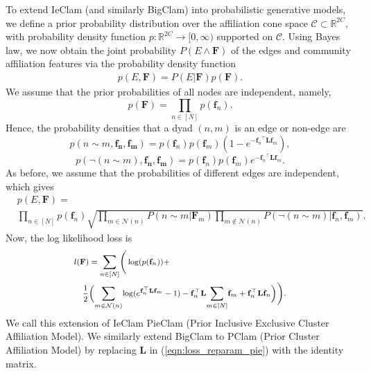 \documentclass{article}
\theoremstyle{plain}
\theoremstyle{definition}
\theoremstyle{remark}
\newcommand{\sumgraphm}{\underset{m \in [N]}{\sum}}
\def \sumgraphu {\underset{n\in [N]}{ \sum}}
\def \sumneighbors {\underset {m\in{\mathcal{N}(n)}}{\sum}}
\newcommand{\flf}{\mathbf{f}_n^\top   \mathbf{L} \mathbf{f}_m}
\begin{document}
To extend IeClam (and similarly BigClam) into probabilistic generative models, we define a prior probability distribution over the affiliation cone space $\mathcal{C}\subset \mathbb{R}^{2C}$, with probability density function $p:\mathbb{R}^{2C}\rightarrow [0,\infty)$ supported on $\mathcal{C}$. Using Bayes law, we now obtain the joint probability $P(E \wedge \mathbf{F})$ of the edges and community affiliation features  via the probability density function
\begin{align*}
    p(E ,\mathbf{F}) = P(E|\mathbf{F}) p(\mathbf{F}).
\end{align*}
We assume that the prior probabilities of all nodes are independent, namely,  
\[p(\mathbf{F}) = \underset{n\in [N]}{\prod} p(\mathbf{f}_n).\]
 Hence, the probability densities that a dyad $(n,m)$ is an edge or non-edge are
\[p(n\sim m, \mathbf{f_n}, \mathbf{f_m}) = p(\mathbf{f}_n)p(\mathbf{f}_m)(1 - e^{-{\mathbf{f}_n}^\top  \mathbf{L} {\mathbf{f}_m}}),\]
\[p(\neg(n\sim m), \mathbf{f_n}, \mathbf{f_m}) = p(\mathbf{f}_n)p(\mathbf{f}_m)e^{-{\mathbf{f}_n}^\top  \mathbf{L} {\mathbf{f}_m}}.\]
As before, we assume that the probabilities of different edges are independent, which gives
\begingroup
\scriptsize
\begin{equation}
\label{eqn:likelihood_prior}
\begin{aligned}
    &p(E, \mathbf{F}) =  \\ &\prod_{n \in [N]} p(\mathbf{f}_n)
        \sqrt{\prod_{m \in \mathcal{N}(n)}P(n\sim m|\mathbf{F}_m)\prod_{m \notin \mathcal{N}(n)}{P(\neg(n\sim m)|\mathbf{f}_n, \mathbf{f}_m)}
        }. 
 \end{aligned}
 \end{equation}
 \endgroup
Now, the log likelihood loss is
\begingroup
\begin{equation}
\footnotesize
\begin{aligned}
\label{eqn:loss_reparam_pie}
   &  l(\mathbf{F})= \sumgraphu \Bigg(\log(p(\mathbf{f}_n)) + \\
   & \quad  \frac{1}{2} \Big(\sumneighbors{\log(e^{\flf} - 1)}  -  \mathbf{f}_n^\top  \mathbf{L}{\sumgraphm{\mathbf{f}_m}} + \mathbf{f}_n^\top  \mathbf{L}\mathbf{f}_n \Big) \Bigg).
\end{aligned}
\end{equation}
\endgroup
We call this extension of IeClam PieClam (Prior Inclusive Exclusive Cluster Affiliation Model). We similarly extend BigClam to PClam (Prior Cluster Affiliation Model) by replacing $\mathbf{L}$ in (\ref{eqn:loss_reparam_pie}) with the identity matrix. 
\end{document}
